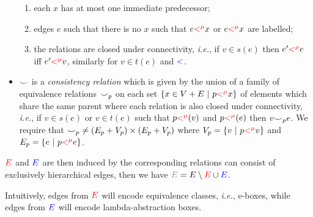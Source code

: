 \begin{definition}
\begin{itemize}
\begin{enumerate}
          \item each $x$ has at most one immediate predecessor;
          \item edges $e$ such that there is no $x$ such that $e \textcolor{red}{<^{\mu}} x$ or $e \textcolor{red}{<^{\mu}} x$ are labelled;
          \item the relations are closed under connectivity, \emph{i.e.}, if $v \in s(e)$ then $e' \textcolor{red}{<^{\mu}} e$ iff $e' \textcolor{red}{<^{\mu}} v$, similarly for $v \in t(e)$ and $\textcolor{blue}{<}$.
        \end{enumerate}
  \item ${\smile}$ is a \textit{consistency relation} which is given by the union of a family of equivalence relations ${\smile}_p$ on each set $\{x \in V + E ~|~ p \textcolor{red}{<^\mu} x\}$ of elements which share the same parent where each relation is also closed under connectivity, \textit{i.e.}, if $v \in s(e)$ or $v \in t(e)$ such that $p \textcolor{red}{<^{\mu}}(v)$ and $p \textcolor{red}{<^{\mu}}(e)$ then $v {\smile}_{p} e$.
  We require that ${\smile}_{p} \not = (E_{p} + V_{p}) \times (E_{p} + V_{p})$ where $V_{p} = \{ v ~ | ~ p \textcolor{red}{<^{\mu}} v\}$ and $E_{p} = \{ e ~ | ~ p \textcolor{red}{<^{\mu}} e\}$.
\end{itemize} 
$\textcolor{red}{E}$ and $\textcolor{blue}{E}$ are then induced by the corresponding relations can consist of exclusively hierarchical edges, then we have $\textcolor{gray}{E} = E \setminus \textcolor{red}{E} \cup \textcolor{blue}{E}$.
\end{definition}

Intuitively, edges from $\textcolor{red}{E}$ will encode equivalence classes, \emph{i.e.}, e-boxes, while edges from $\textcolor{blue}{E}$ will encode lambda-abstraction boxes.

